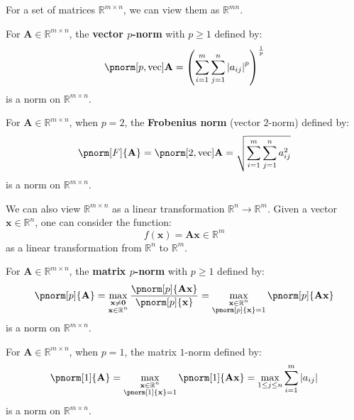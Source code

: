 \documentclass{huhtakm-template-book-v2}
\begin{document}
    For a set of matrices $\mathbb{R}^{m \times n}$, we can view them as $\mathbb{R}^{mn}$.
    \begin{eg}
        For $\mathbf{A} \in \mathbb{R}^{m \times n}$, the \textbf{vector $p$-norm} with $p \geq 1$ defined by:
        \begin{equation*}
            \pnorm[p,\text{vec}]{\mathbf{A}} = \left(\sum_{i=1}^{m}\sum_{j=1}^{n}\abs{a_{ij}}^{p}\right)^{\frac{1}{p}}
        \end{equation*}
        is a norm on $\mathbb{R}^{m \times n}$.
    \end{eg}
    \begin{eg}
        For $\mathbf{A} \in \mathbb{R}^{m \times n}$, when $p = 2$, the \textbf{Frobenius norm} (vector $2$-norm) defined by:
        \begin{equation*}
            \pnorm[F]{\mathbf{A}} = \pnorm[2,\text{vec}]{\mathbf{A}} = \sqrt{\sum_{i=1}^{m}\sum_{j=1}^{n}a_{ij}^{2}}
        \end{equation*}
        is a norm on $\mathbb{R}^{m \times n}$.
    \end{eg}
    We can also view $\mathbb{R}^{m \times n}$ as a linear transformation $\mathbb{R}^{n} \to \mathbb{R}^{m}$. Given a vector $\mathbf{x} \in \mathbb{R}^{n}$, one can consider the function:
    \begin{equation*}
        f(\mathbf{x}) = \mathbf{Ax} \in \mathbb{R}^{m}
    \end{equation*}
    as a linear transformation from $\mathbb{R}^{n}$ to $\mathbb{R}^{m}$.
    \begin{eg}
        For $\mathbf{A} \in \mathbb{R}^{m \times n}$, the \textbf{matrix $p$-norm} with $p\geq 1$ defined by:
        \begin{equation*}
            \pnorm[p]{\mathbf{A}} = \max_{\substack{\mathbf{x} \neq \mathbf{0}\\\mathbf{x} \in \mathbb{R}^{n}}}\frac{\pnorm[p]{\mathbf{Ax}}}{\pnorm[p]{\mathbf{x}}} = \max_{\substack{\mathbf{x} \in \mathbb{R}^{n}\\\pnorm[p]{\mathbf{x}} = 1}}\pnorm[p]{\mathbf{Ax}}
        \end{equation*}
        is a norm on $\mathbb{R}^{m \times n}$.
    \end{eg}
    \begin{eg}
        For $\mathbf{A} \in \mathbb{R}^{m \times n}$, when $p = 1$, the matrix $1$-norm defined by:
        \begin{equation*}
            \pnorm[1]{\mathbf{A}} = \max_{\substack{\mathbf{x} \in \mathbb{R}^{n}\\\pnorm[1]{\mathbf{x}} = 1}}\pnorm[1]{\mathbf{Ax}} = \max_{1 \leq j \leq n}\sum_{i=1}^{m}\abs{a_{ij}}
        \end{equation*}
        is a norm on $\mathbb{R}^{m \times n}$.
    \end{eg}
\end{document}
